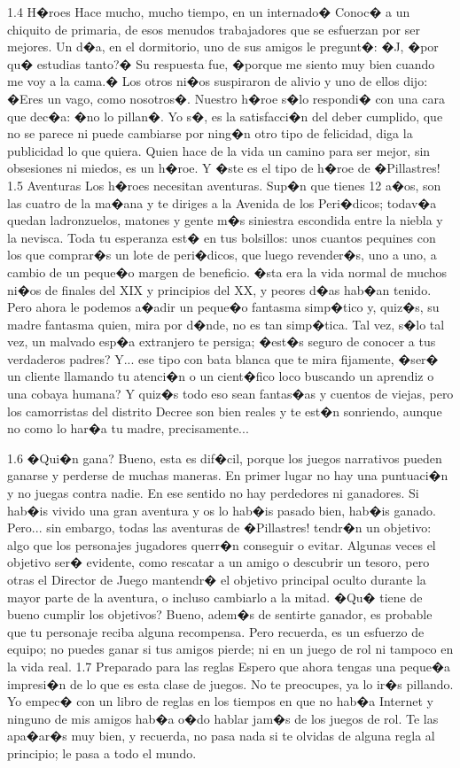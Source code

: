1.4 H�roes
Hace mucho, mucho tiempo, en un internado� Conoc� a un chiquito de primaria, de esos menudos trabajadores que se esfuerzan por ser mejores. Un d�a, en el dormitorio, uno de sus amigos le pregunt�: �J, �por qu� estudias tanto?� Su respuesta fue, �porque me siento muy bien cuando me voy a la cama.� Los otros ni�os suspiraron de alivio y uno de ellos dijo: �Eres un vago, como nosotros�. Nuestro h�roe s�lo respondi� con una cara que dec�a: �no lo pillan�. Yo s�, es la satisfacci�n del deber cumplido, que no se parece ni puede cambiarse por ning�n otro tipo de felicidad, diga la publicidad lo que quiera. Quien hace de la vida un camino para ser mejor, sin obsesiones ni miedos, es un h�roe. Y �ste es el tipo de h�roe de �Pillastres!
1.5 Aventuras
Los h�roes necesitan aventuras. Sup�n que tienes 12 a�os, son las cuatro de la ma�ana y te diriges a la Avenida de los Peri�dicos; todav�a quedan ladronzuelos, matones y gente m�s siniestra escondida entre la niebla y la nevisca. Toda tu esperanza est� en tus bolsillos: unos cuantos pequines con los que comprar�s un lote de peri�dicos, que luego revender�s, uno a uno, a cambio de un peque�o margen de beneficio.
�sta era la vida normal de muchos ni�os de finales del XIX y principios del XX, y peores d�as hab�an tenido. Pero ahora le podemos a�adir un peque�o fantasma simp�tico y, quiz�s, su madre fantasma quien, mira por d�nde, no es tan simp�tica. Tal vez, s�lo tal vez, un malvado esp�a extranjero te persiga; �est�s seguro de conocer a tus verdaderos padres? Y... ese tipo con bata blanca que te mira fijamente, �ser� un cliente llamando tu atenci�n o un cient�fico loco buscando un aprendiz o una cobaya humana? Y quiz�s todo eso sean fantas�as y cuentos de viejas, pero los camorristas del distrito Decree son bien reales y te est�n sonriendo, aunque no como lo har�a tu madre, precisamente...


1.6 �Qui�n gana?
Bueno, esta es dif�cil, porque los juegos narrativos pueden ganarse y perderse de muchas maneras. En primer lugar no hay una puntuaci�n y no juegas contra nadie. En ese sentido no hay perdedores ni ganadores. Si hab�is vivido una gran aventura y os lo hab�is pasado bien, hab�is ganado.
Pero... sin embargo, todas las aventuras de �Pillastres! tendr�n un objetivo: algo que los personajes jugadores querr�n conseguir o evitar. Algunas veces el objetivo ser� evidente, como rescatar a un amigo o descubrir un tesoro, pero otras el Director de Juego mantendr� el objetivo principal oculto durante la mayor parte de la aventura, o incluso cambiarlo a la mitad.
�Qu� tiene de bueno cumplir los objetivos? Bueno, adem�s de sentirte ganador, es probable que tu personaje reciba alguna recompensa. Pero recuerda, es un esfuerzo de equipo; no puedes ganar si tus amigos pierde; ni en un juego de rol ni tampoco en la vida real.
1.7 Preparado para las reglas
Espero que ahora tengas una peque�a impresi�n de lo que es esta clase de juegos. No te preocupes, ya lo ir�s pillando. Yo empec� con un libro de reglas en los tiempos en que no hab�a Internet y ninguno de mis amigos hab�a o�do hablar jam�s de los juegos de rol. Te las apa�ar�s muy bien, y recuerda, no pasa nada si te olvidas de alguna regla al principio; le pasa a todo el mundo.


